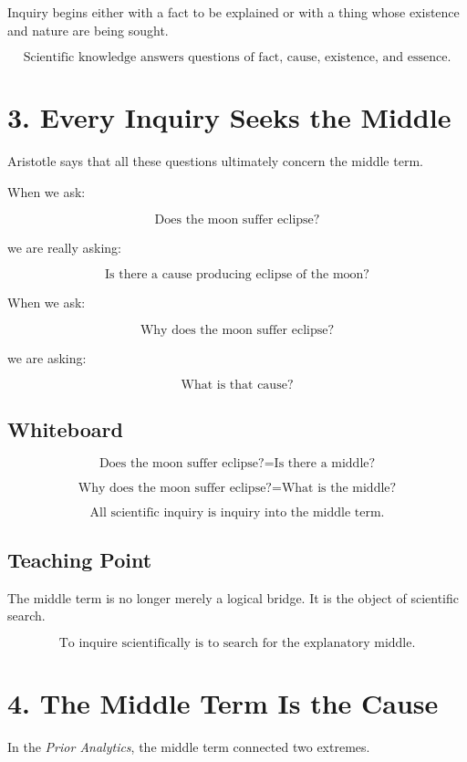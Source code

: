 \documentclass[12pt]{article}
\begin{document}
Inquiry begins either with a fact to be explained or with a thing whose
existence and nature are being sought.

\[
\boxed{
\text{Scientific knowledge answers questions of fact, cause, existence, and essence.}
}
\]

\section*{3. Every Inquiry Seeks the Middle}

Aristotle says that all these questions ultimately concern the middle term.

When we ask:

\[
\text{Does the moon suffer eclipse?}
\]

we are really asking:

\[
\text{Is there a cause producing eclipse of the moon?}
\]

When we ask:

\[
\text{Why does the moon suffer eclipse?}
\]

we are asking:

\[
\text{What is that cause?}
\]

\subsection*{Whiteboard}

\[
\text{Does the moon suffer eclipse?}
=
\text{Is there a middle?}
\]

\[
\text{Why does the moon suffer eclipse?}
=
\text{What is the middle?}
\]

\[
\boxed{
\text{All scientific inquiry is inquiry into the middle term.}
}
\]

\subsection*{Teaching Point}

The middle term is no longer merely a logical bridge. It is the object of
scientific search.

\[
\boxed{
\text{To inquire scientifically is to search for the explanatory middle.}
}
\]

\section*{4. The Middle Term Is the Cause}

In the \textit{Prior Analytics}, the middle term connected two extremes.
\end{document}
